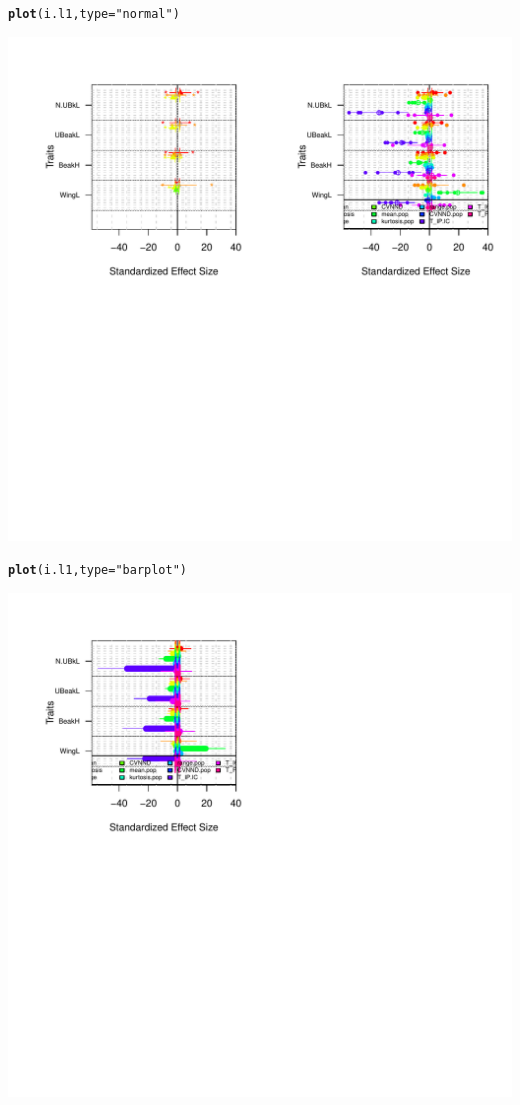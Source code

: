 \documentclass[12pt]{article}\usepackage[]{graphicx}\usepackage[]{color}
\makeatletter
\def\maxwidth{ %
  \ifdim\Gin@nat@width>\linewidth
    \linewidth
  \else
    \Gin@nat@width
  \fi
}
\newcommand{\hlstr}[1]{\textcolor[rgb]{0.192,0.494,0.8}{#1}}%
\newcommand{\hlstd}[1]{\textcolor[rgb]{0.345,0.345,0.345}{#1}}%
\newcommand{\hlkwc}[1]{\textcolor[rgb]{0.333,0.667,0.333}{#1}}%
\newcommand{\hlkwd}[1]{\textcolor[rgb]{0.737,0.353,0.396}{\textbf{#1}}}%
\newenvironment{kframe}{%
 \def\at@end@of@kframe{}%
 \ifinner\ifhmode%
  \def\at@end@of@kframe{\end{minipage}}%
  \begin{minipage}{\columnwidth}%
 \fi\fi%
 \def\FrameCommand##1{\hskip\@totalleftmargin \hskip-\fboxsep
 \colorbox{shadecolor}{##1}\hskip-\fboxsep
     \hskip-\linewidth \hskip-\@totalleftmargin \hskip\columnwidth}%
 \MakeFramed {\advance\hsize-\width
   \@totalleftmargin\z@ \linewidth\hsize
   \@setminipage}}%
 {\par\unskip\endMakeFramed%
 \at@end@of@kframe}
\newenvironment{knitrout}{}{} %
\makeatother
\begin{document}
\begin{knitrout}
\begin{kframe}
{\ttfamily\noindent\bfseries\color{errorcolor}{\#\# Error: valeur manquante là où TRUE / FALSE est requis}}\begin{alltt}
\hlkwd{plot}\hlstd{(i.l1,}\hlkwc{type}\hlstd{=}\hlstr{"normal"}\hlstd{)}
\end{alltt}
\end{kframe}
\includegraphics[width=\maxwidth]{figure/unnamed-chunk-432} 
\begin{kframe}\begin{alltt}
\hlkwd{plot}\hlstd{(i.l1,}\hlkwc{type}\hlstd{=}\hlstr{"barplot"}\hlstd{)}
\end{alltt}
\end{kframe}
\includegraphics[width=\maxwidth]{figure/unnamed-chunk-433} 

\end{knitrout}
\end{document}
